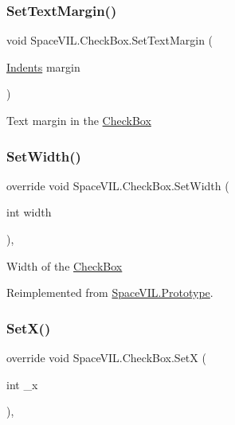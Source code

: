 \subsubsection{\texorpdfstring{Set\+Text\+Margin()}{SetTextMargin()}}
{\footnotesize\ttfamily void Space\+V\+I\+L.\+Check\+Box.\+Set\+Text\+Margin (\begin{DoxyParamCaption}\item[{\mbox{\hyperlink{struct_space_v_i_l_1_1_decorations_1_1_indents}{Indents}}}]{margin }\end{DoxyParamCaption})\hspace{0.3cm}{\ttfamily [inline]}}



Text margin in the \mbox{\hyperlink{class_space_v_i_l_1_1_check_box}{Check\+Box}} 

\mbox{\label{class_space_v_i_l_1_1_check_box_abcf26de1908f7d590b768d64851e8004}} 
\subsubsection{\texorpdfstring{Set\+Width()}{SetWidth()}}
{\footnotesize\ttfamily override void Space\+V\+I\+L.\+Check\+Box.\+Set\+Width (\begin{DoxyParamCaption}\item[{int}]{width }\end{DoxyParamCaption})\hspace{0.3cm}{\ttfamily [inline]}, {\ttfamily [virtual]}}



Width of the \mbox{\hyperlink{class_space_v_i_l_1_1_check_box}{Check\+Box}} 



Reimplemented from \mbox{\hyperlink{class_space_v_i_l_1_1_prototype_a6a4f1b9581f4d18f1c3a3e287d4b2a2b}{Space\+V\+I\+L.\+Prototype}}.

\mbox{\label{class_space_v_i_l_1_1_check_box_a321e86a7868cb30b842988a4d607acc1}} 
\subsubsection{\texorpdfstring{Set\+X()}{SetX()}}
{\footnotesize\ttfamily override void Space\+V\+I\+L.\+Check\+Box.\+SetX (\begin{DoxyParamCaption}\item[{int}]{\+\_\+x }\end{DoxyParamCaption})\hspace{0.3cm}{\ttfamily [inline]}, {\ttfamily [virtual]}}



